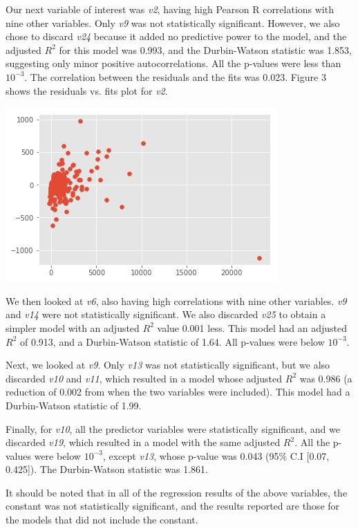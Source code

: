 \documentclass[12pt,a4paper,twocolumn]{article}
\begin{document}
Our next variable of interest was \textit{v2}, having high Pearson R correlations with nine other variables. Only \textit{v9} was not statistically significant. However, we also chose to discard \textit{v24} because it added no predictive power to the model, and the adjusted $R^2$ for this model was 0.993, and the Durbin-Watson statistic was 1.853, suggesting only minor positive autocorrelations. All the p-values were less than $10^{-3}$. The correlation between the residuals and the fits was 0.023. Figure 3 shows the residuals vs. fits plot for \textit{v2}.

\includegraphics[scale=0.5]{fig3.png}
\begingroup
{}
\endgroup
\hfill\break

We then looked at \textit{v6}, also having high correlations with nine other variables. \textit{v9} and \textit{v14} were not statistically significant. We also discarded \textit{v25} to obtain a simpler model with an adjusted $R^2$ value 0.001 less. This model had an adjusted $R^2$ of 0.913, and a Durbin-Watson statistic of 1.64. All p-values were below $10^{-3}$.

Next, we looked at \textit{v9}. Only \textit{v13} was not statistically significant, but we also discarded \textit{v10} and \textit{v11}, which resulted in a model whose adjusted $R^2$ was 0.986 (a reduction of 0.002 from when the two variables were included). This model had a Durbin-Watson statistic of 1.99.

Finally, for \textit{v10}, all the predictor variables were statistically significant, and we discarded \textit{v19}, which resulted in a model with the same adjusted $R^2$. All the p-values were below $10^{-3}$, except \textit{v13}, whose p-value was 0.043 (95\% C.I [0.07, 0.425]). The Durbin-Watson statistic was 1.861.

It should be noted that in all of the regression results of the above variables, the constant was not statistically significant, and the results reported are those for the models that did not include the constant.
\end{document}
